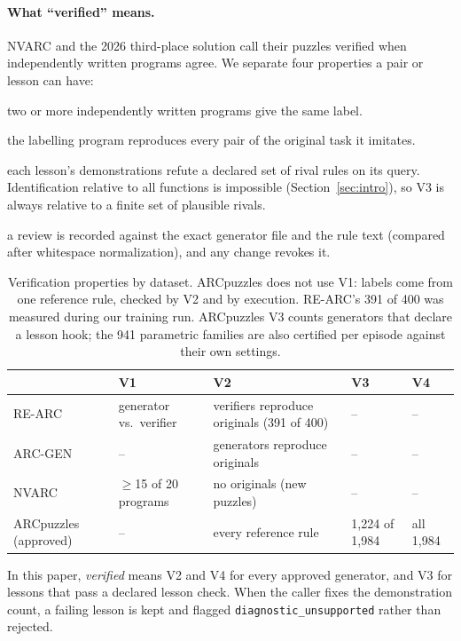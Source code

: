 \documentclass[11pt]{article}
\begin{document}
\paragraph{What ``verified'' means.} NVARC and the 2026 third-place solution call
their puzzles verified when independently written programs agree. We separate
four properties a pair or lesson can have:
\begin{description}[nosep,leftmargin=1.5em]
  \item[V1 consistent:] two or more independently written programs give the same label.
  \item[V2 grounded:] the labelling program reproduces every pair of the original task it imitates.
  \item[V3 identifiable:] each lesson's demonstrations refute a declared set of rival rules on its query. Identification relative to all functions is impossible (Section~\ref{sec:intro}), so V3 is always relative to a finite set of plausible rivals.
  \item[V4 reviewed and bound:] a review is recorded against the exact generator file and the rule text (compared after whitespace normalization), and any change revokes it.
\end{description}

\begin{table}[H]
\centering
\small
\begin{tabularx}{\linewidth}{lXXXX}
\toprule
 & V1 & V2 & V3 & V4 \\
\midrule
RE-ARC & generator vs.\ verifier & verifiers reproduce originals (391 of 400) & -- & -- \\
ARC-GEN & -- & generators reproduce originals & -- & -- \\
NVARC & $\ge$15 of 20 programs & no originals (new puzzles) & -- & -- \\
ARCpuzzles (approved) & -- & every reference rule & 1,224 of 1,984 & all 1,984 \\
\bottomrule
\end{tabularx}
\caption{Verification properties by dataset. ARCpuzzles does not use V1:
labels come from one reference rule, checked by V2 and by execution. RE-ARC's
391 of 400 was measured during our training run. ARCpuzzles V3 counts
generators that declare a lesson hook; the 941 parametric families are also
certified per episode against their own settings.}
\end{table}

In this paper, \emph{verified} means V2 and V4 for every approved generator,
and V3 for lessons that pass a declared lesson check. When the caller fixes
the demonstration count, a failing lesson is kept and flagged
\texttt{diagnostic\_unsupported} rather than rejected.
\end{document}
